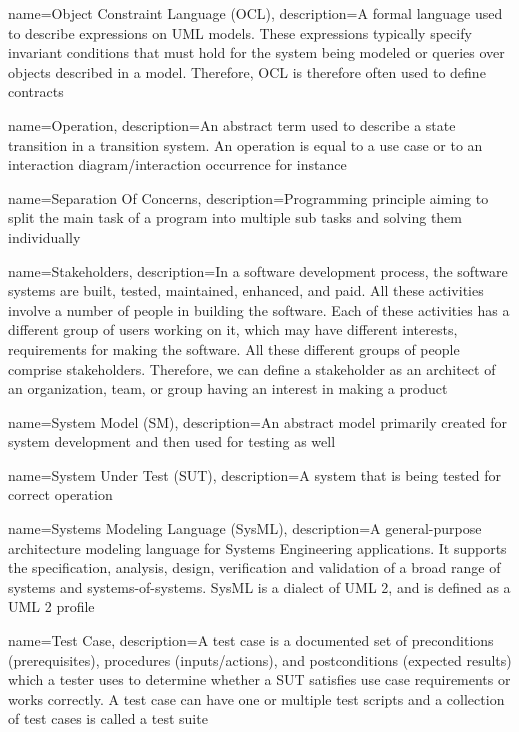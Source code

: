 {
	name={Object Constraint Language (OCL)},
	description={A formal language used to describe expressions on UML models. These expressions typically specify invariant conditions that must hold for the system being modeled or queries over objects described in a model. Therefore, OCL is therefore often used to define contracts \cite{OCL}}
}

{
	name={Operation},
	description={An abstract term used to describe a state transition in a transition system. An operation is equal to a use case or to an interaction diagram/interaction occurrence for instance \cite{ClementineNebut2006, NajlaRaza2007}}
}

{
	name={Separation Of Concerns},
	description={Programming principle aiming to split the main task of a program into multiple sub tasks and solving them individually \cite{Metsa}}
}

{
	name={Stakeholders},
	description={In a software development process, the software systems are built, tested, maintained, enhanced, and paid. All these activities involve a number of people in building the software. Each of these activities has a different group of users working on it, which may have different interests, requirements for making the software. All these different groups of people comprise stakeholders. Therefore, we can define a stakeholder as an architect of an organization, team, or group having an interest in making a product \cite{Stakeholders}}
}

{
	name={System Model (SM)},
	description={An abstract model primarily created for system development and then used for testing as well \cite{Paper1}}
}

{
	name={System Under Test (SUT)},
	description={A system that is being tested for correct operation \cite{Paper1}}
}

{
	name={Systems Modeling Language (SysML)},
	description={A general-purpose architecture modeling language for Systems Engineering applications. It supports the specification, analysis, design, verification and validation of a broad range of systems and systems-of-systems. SysML is a dialect of UML 2, and is defined as a UML 2 profile \cite{SysML}}
}

{
	name={Test Case},
	description={A test case is a documented set of preconditions (prerequisites), procedures (inputs/actions), and postconditions (expected results) which a tester uses to determine whether a SUT satisfies use case requirements or works correctly. A test case can have one or multiple test scripts and a collection of test cases is called a test suite \cite{STFTestCase}}
}

